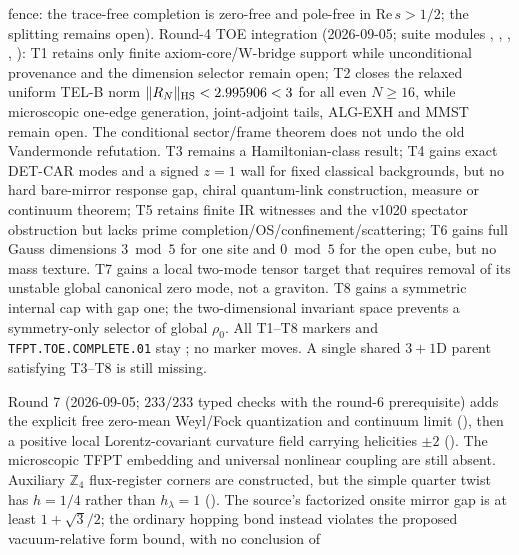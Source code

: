 \documentclass[11pt,a4paper]{article}
\newcommand{\Z}{\mathbb{Z}}
\begin{document}
\begin{keybox}
fence: the trace-free completion is zero-free and pole-free in $\mathrm{Re}\,s>1/2$; the splitting remains open).
Round-4 TOE integration (2026-09-05; suite modules
,
,
,
,
):
T1 retains only finite axiom-core/W-bridge support while unconditional provenance and
the dimension selector remain open; T2 closes the relaxed uniform TEL-B norm
$\|R_N\|_{\rm HS}<2.995906<3$ for all even $N\ge16$, while microscopic
one-edge generation, joint-adjoint tails, ALG-EXH and MMST remain open.
The conditional sector/frame theorem does not undo the old Vandermonde refutation.
T3 remains a Hamiltonian-class result; T4 gains exact DET-CAR modes and a signed
$z=1$ wall for fixed classical backgrounds, but no hard bare-mirror response
gap, chiral quantum-link construction, measure or continuum theorem;
T5 retains finite IR witnesses and the v1020 spectator obstruction but lacks
prime completion/OS/confinement/scattering;
T6 gains full Gauss dimensions $3\bmod5$ for one site and $0\bmod5$ for the
open cube, but no mass texture. T7 gains a local two-mode tensor target that
requires removal of its unstable global canonical zero mode, not a graviton.
T8 gains a symmetric internal cap with gap one; the two-dimensional invariant
space prevents a symmetry-only selector of global $\rho_0$. All T1--T8
markers and \texttt{TFPT.TOE.COMPLETE.01} stay \mO; no marker moves.  A single shared
$3{+}1$D parent satisfying T3--T8 is still missing.
\par\smallskip\noindent
Round 7 (2026-09-05; $233/233$ typed checks with the round-6 prerequisite)
adds the explicit free zero-mean Weyl/Fock quantization and continuum limit
(), then a positive local
Lorentz-covariant curvature field carrying helicities $\pm2$
(). The microscopic TFPT embedding
and universal nonlinear coupling are still absent. Auxiliary $\Z_4$
flux-register corners are constructed, but the simple quarter twist has
$h=1/4$ rather than $h_\lambda=1$
(). The source's factorized onsite
mirror gap is at least $1+\sqrt3/2$; the ordinary hopping bond instead
violates the proposed vacuum-relative form bound, with no conclusion of

\end{keybox}
\end{document}
